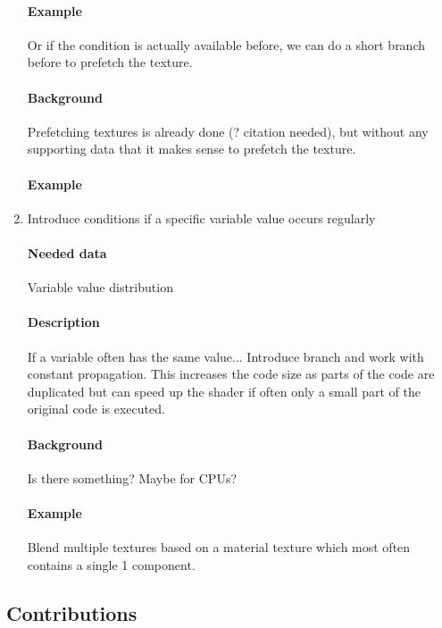 \begin{enumerate}
	\paragraph{Example}
	
	Or if the condition is actually available before, we can do a short branch before to prefetch the texture.
	\paragraph{Background} Prefetching textures is already done (? citation needed), but without any supporting data that it makes sense to prefetch the texture.
	\paragraph{Example}
	
	\item Introduce conditions if a specific variable value occurs regularly
	\paragraph{Needed data} Variable value distribution
	\paragraph{Description} If a variable often has the same value... Introduce branch and work with constant propagation. This increases the code size as parts of the code are duplicated but can speed up the shader if often only a small part of the original code is executed.
	\paragraph{Background} Is there something? Maybe for CPUs?
	\paragraph{Example} Blend multiple textures based on a material texture which most often contains a single 1 component.
\end{enumerate}

\subsection{Contributions}
\label{sub:contributions}
